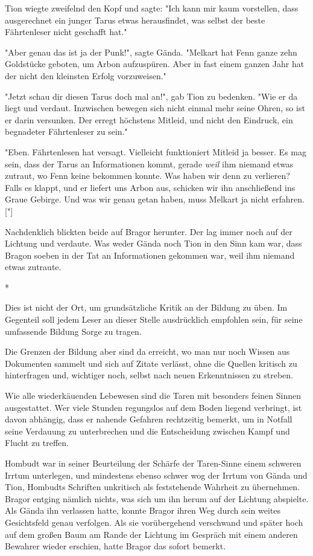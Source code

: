 \documentclass[10pt, a4paper, oneside]{book}
\begin{document}
\begin{multicols}{2}
Tion wiegte zweifelnd den Kopf und sagte: "Ich kann mir kaum vorstellen, dass ausgerechnet ein junger Tarus etwas herausfindet, was selbst der beste Fährtenleser nicht geschafft hat." 

"Aber genau das ist ja der Punk!", sagte Gända. "Melkart hat Fenn ganze zehn Goldstücke geboten, um Arbon aufzuspüren. Aber in fast einem ganzen Jahr hat der nicht den kleinsten Erfolg vorzuweisen." 

"Jetzt schau dir diesen Tarus doch mal an!", gab Tion zu bedenken. "Wie er da liegt und verdaut. Inzwischen bewegen sich nicht einmal mehr seine Ohren, so ist er darin versunken. Der erregt höchstens Mitleid, und nicht den Eindruck, ein begnadeter Fährtenleser zu sein." 

"Eben. Fährtenlesen hat versagt. Vielleicht funktioniert Mitleid ja besser. Es mag sein, dass der Tarus an Informationen kommt, gerade \textit{weil} ihm niemand etwas zutraut, wo Fenn keine bekommen konnte. Was haben wir denn zu verlieren? Falls es klappt, und er liefert uns Arbon aus, schicken wir ihn anschließend ins Graue Gebirge. Und was wir genau getan haben, muss Melkart ja nicht erfahren.["] 

Nachdenklich blickten beide auf Bragor herunter. Der lag immer noch auf der Lichtung und verdaute. Was weder Gända noch Tion in den Sinn kam war, dass Bragon soeben in der Tat an Informationen gekommen war, weil ihm niemand etwas zutraute. 

\begin{center}
    *
\end{center}

Dies ist nicht der Ort, um grundsätzliche Kritik an der Bildung zu üben. Im Gegenteil soll jedem Leser an dieser Stelle ausdrücklich empfohlen sein, für seine umfassende Bildung Sorge zu tragen. 

Die Grenzen der Bildung aber sind da erreicht, wo man nur noch Wissen aus Dokumenten sammelt und sich auf Zitate verlässt, ohne die Quellen kritisch zu hinterfragen und, wichtiger noch, selbst nach neuen Erkenntnissen zu streben. 

Wie alle wiederkäuenden Lebewesen sind die Taren mit besonders feinen Sinnen ausgestattet. Wer viele Stunden regungslos auf dem Boden liegend verbringt, ist davon abhängig, dass er nahende Gefahren rechtzeitig bemerkt, um in Notfall seine Verdauung zu unterbrechen und die Entscheidung zwischen Kampf und Flucht zu treffen. 

Hombudt war in seiner Beurteilung der Schärfe der Taren-Sinne einem schweren Irrtum unterlegen, und mindestens ebenso schwer wog der Irrtum von Gända und Tion, Hombudts Schriften unkritisch als feststehende Wahrheit zu übernehmen. Bragor entging nämlich nichts, was sich um ihn herum auf der Lichtung abspielte. Als Gända ihn verlassen hatte, konnte Bragor ihren Weg durch sein weites Gesichtsfeld genau verfolgen. Als sie vorübergehend verschwand und später hoch auf dem großen Baum am Rande der Lichtung im Gespräch mit einem anderen Bewahrer wieder erschien, hatte Bragor das sofort bemerkt. 


\end{multicols}
\end{document}
